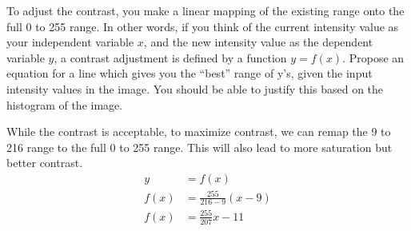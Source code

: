 To adjust the contrast, you make a linear mapping of the existing range onto the full 0 to 255 range. In other words, if you think of the current intensity value as your independent variable $x$, and the new intensity value as the dependent variable $y$, a contrast adjustment is defined by a function $y = f(x)$. Propose an equation for a line which gives you the “best” range of y’s, given the input intensity values in the image. You should be able to justify this based on the histogram of the image.

\begin{solution}
    While the contrast is acceptable, to maximize contrast, we can remap the 9 to 216 range to the full 0 to 255 range. This will also lead to more saturation but better contrast.
    \begin{align*}
        y &= f(x) \\
        f(x) &= \frac{255}{216 - 9}(x - 9) \\
        f(x) &= \frac{255}{207}x - 11
    \end{align*}
\end{solution}